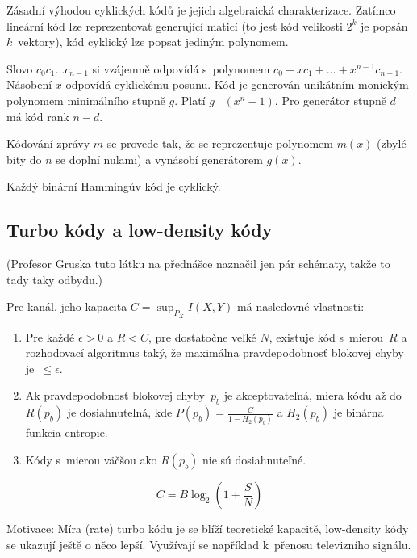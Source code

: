 Zásadní výhodou cyklických kódů je jejich algebraická charakterizace.
Zatímco lineární kód lze reprezentovat generující maticí (to jest kód
velikosti $2^k$ je popsán $k$~vektory), kód cyklický lze popsat
jediným polynomem.

Slovo $c_0c_1 \ldots c_{n-1}$ si vzájemně odpovídá s~polynomem
$c_0 + x c_1 + \ldots + x^{n-1} c_{n-1}$. Násobení $x$ odpovídá
cyklickému posunu. Kód je generován unikátním monickým polynomem
minimálního stupně $g$. Platí $g \mid (x^n - 1)$.
Pro generátor stupně $d$ má kód rank $n - d$.

Kódování zprávy $m$ se provede tak, že se reprezentuje polynomem $m(x)$
(zbylé bity do $n$ se doplní nulami)
a vynásobí generátorem $g(x)$.

Každý binární Hammingův kód je cyklický.

\pagebreak

\subsection{Turbo kódy a low-density kódy}

(Profesor Gruska tuto látku na přednášce naznačil jen pár schématy, takže
to tady taky odbydu.)

\begin{theorem}[Shannon]
	Pre kanál, jeho kapacita $C=\sup_{P_X}I(X,Y)$ má nasledovné vlastnosti:
	\begin{enumerate}
		\item Pre každé $\epsilon > 0$ a $R < C$, pre dostatočne veľké $N$, existuje
		kód s~mierou~$R$ a rozhodovací algoritmus taký, že maximálna pravdepodobnosť
		blokovej chyby je~$\leq \epsilon$.
		\item Ak pravdepodobnosť blokovej chyby~$p_b$ je akceptovateľná, miera
		kódu až do $R(p_b)$ je dosiahnuteľná, kde $P(p_b)=\frac{C}{1-H_2(p_b)}$ a
		$H_2(p_b)$ je binárna funkcia entropie.
		\item Kódy s~mierou väčšou ako $R(p_b)$ nie sú dosiahnuteľné.
	\end{enumerate}
\end{theorem}

\begin{theorem}[Shannon]
	\[ 
		C = B \log_2\left(1+\frac{S}{N}\right)
	\]
\end{theorem}


Motivace: Míra (rate) turbo kódu je se blíží teoretické kapacitě,
low-density kódy se ukazují ještě o něco lepší. Využívají se například
k~přenosu televizního signálu.

